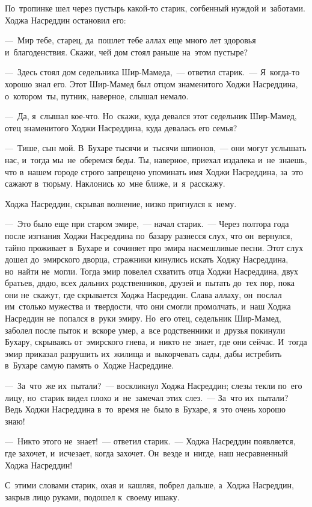 \documentclass[12pt,a4paper]{book}
\begin{document}
По~тропинке шел через пустырь какой-то старик, согбенный нуждой и~заботами. Ходжа Насреддин остановил его:

—~Мир тебе, старец, да~пошлет тебе аллах еще много лет здоровья и~благоденствия. Скажи, чей дом стоял раньше на~этом пустыре?

—~Здесь стоял дом седельника Шир-Мамеда,~— ответил старик.~— Я~когда-то хорошо знал его. Этот Шир-Мамед был отцом знаменитого Ходжи Насреддина, о~котором~ты, путник, наверное, слышал немало.

—~Да, я~слышал кое-что. Но~скажи, куда девался этот седельник Шир-Мамед, отец знаменитого Ходжи Насреддина, куда девалась его семья?

—~Тише, сын мой. В~Бухаре тысячи и~тысячи шпионов,~— они могут услышать нас, и~тогда мы~не~оберемся беды. Ты, наверное, приехал издалека и~не~знаешь, что в~нашем городе строго запрещено упоминать имя Ходжи Насреддина, за~это сажают в~тюрьму. Наклонись ко~мне ближе, и~я~расскажу.

Ходжа Насреддин, скрывая волнение, низко пригнулся к~нему.

—~Это было еще при старом эмире,~— начал старик.~— Через полтора года после изгнания Ходжи Насреддина по~базару разнесся слух, что он~вернулся, тайно проживает в~Бухаре и~сочиняет про эмира насмешливые песни. Этот слух дошел до~эмирского дворца, стражники кинулись искать Ходжу Насреддина, но~найти не~могли. Тогда эмир повелел схватить отца Ходжи Насреддина, двух братьев, дядю, всех дальних родственников, друзей и~пытать до~тех пор, пока они не~скажут, где скрывается Ходжа Насреддин. Слава аллаху, он~послал им~столько мужества и~твердости, что они смогли промолчать, и~наш Ходжа Насреддин не~попался в~руки эмиру. Но~его отец, седельник Шир-Мамед, заболел после пыток и~вскоре умер, а~все родственники и~друзья покинули Бухару, скрываясь от~эмирского гнева, и~никто не~знает, где они сейчас. И~тогда эмир приказал разрушить их~жилища и~выкорчевать сады, дабы истребить в~Бухаре самую память о~Ходже Насреддине.

—~За~что~же их~пытали?~— воскликнул Ходжа Насреддин; слезы текли по~его лицу, но~старик видел плохо и~не~замечал этих слез.~— За~что их~пытали? Ведь Ходжи Насреддина в~то~время не~было в~Бухаре, я~это очень хорошо знаю!

—~Никто этого не~знает!~— ответил старик.~— Ходжа Насреддин появляется, где захочет, и~исчезает, когда захочет. Он~везде и~нигде, наш несравненный Ходжа Насреддин!

С~этими словами старик, охая и~кашляя, побрел дальше, а~Ходжа Насреддин, закрыв лицо руками, подошел к~своему ишаку.
\end{document}
